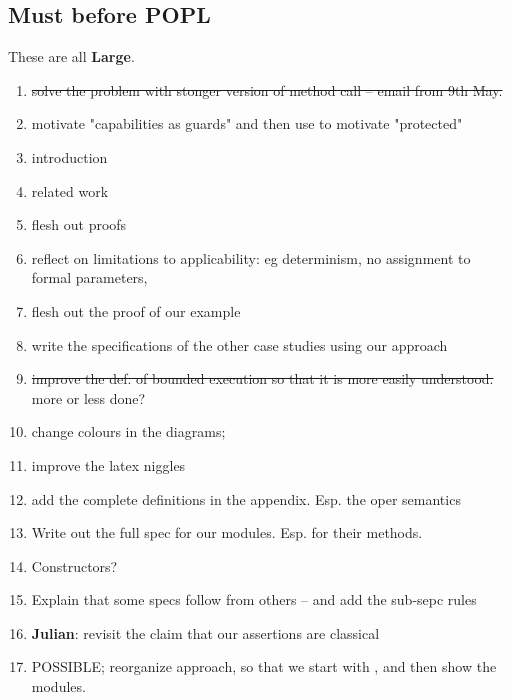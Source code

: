 \documentclass[acmsmall,review,anonymous]{acmart}\settopmatter{printfolios=true}
\begin{document}
 \subsection{Must before POPL}

These are all \textbf{Large}.

\begin{enumerate}
\item
\st{solve the problem with stonger version of method call -- email from 9th May.}

\item
motivate "capabilities as guards" and then use to motivate "protected"
\item
introduction
\item
related work
\item
flesh out proofs
\item
reflect on limitations to applicability: eg determinism, no assignment to formal parameters, 
\item
flesh out the proof of our example
\item
write the specifications of the other case studies using our approach
\item
\st{improve the def. of bounded execution so that it is more easily understood.} more or less done?
\item
change colours in the diagrams; 
\item
improve the latex niggles 
\item
add the complete definitions in the appendix. Esp. the oper semantics
\item
Write out the full spec for our modules. Esp. for their methods.
\item
Constructors?

\item
Explain that some specs follow from others -- and add the sub-sepc rules

\item 
\textbf{Julian}: revisit the claim that our assertions are classical

\item
POSSIBLE; reorganize approach, so that we start with , and then show the modules.
\end{enumerate}
 
\end{document}
